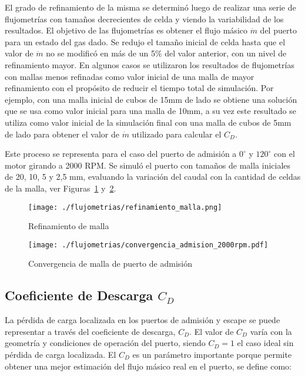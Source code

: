 El grado de refinamiento de la misma se determinó luego de realizar una serie de
flujometrías con tamaños decrecientes de celda y viendo la variabilidad de los
resultados.
%
El objetivo de las flujometrías es obtener el flujo másico $\dot{m}$ del puerto
para un estado del gas dado.
%
Se redujo el tamaño inicial de celda hasta que el valor de $\dot{m}$ no se
modificó en más de un 5\% del valor anterior, con un nivel de refinamiento
mayor.
%
En algunos casos se utilizaron los resultados de flujometrías con mallas menos
refinadas como valor inicial de una malla de mayor refinamiento con el propósito
de reducir el tiempo total de simulación.
%
Por ejemplo, con una malla inicial de cubos de 15mm de lado se obtiene una
solución que se usa como valor inicial para una malla de 10mm, a su vez este
resultado se utiliza como valor inicial de la simulación final con una malla de
cubos de 5mm de lado para obtener el valor de $\dot{m}$ utilizado para calcular
el $C_{D}$.

Este proceso se representa para el caso del puerto de admisión a $0^{\circ}$ y
$120^{\circ}$ con el motor girando a 2000 RPM.
%
Se simuló el puerto con tamaños de malla iniciales de 20, 10, 5 y 2,5 mm,
evaluando la variación del caudal con la cantidad de celdas de la malla, ver
Figuras~\ref{fig:refinamiento} y~\ref{fig:conv_malla}.

\begin{figure}[ht]
  \centering
  \texttt{[image: ./flujometrias/refinamiento\_malla.png]}
  \caption{Refinamiento de malla}\label{fig:refinamiento}
\end{figure}

\begin{figure}[ht]
  \centering
  \texttt{[image: ./flujometrias/convergencia\_admision\_2000rpm.pdf]}
  \caption{Convergencia de malla de puerto de admisión}\label{fig:conv_malla}
\end{figure}


\subsection{Coeficiente de Descarga $C_{D}$}\label{sec:cap2_cd}

La pérdida de carga localizada en los puertos de admisión y escape se puede
representar a través del coeficiente de descarga, $C_{D}$.
%
El valor de $C_{D}$ varía con la geometría y condiciones de operación del
puerto, siendo $C_{D}=1$ el caso ideal sin pérdida de carga localizada.
%
El $C_{D}$ es un parámetro importante porque permite obtener una mejor estimación
del flujo másico real en el puerto, se define como:

